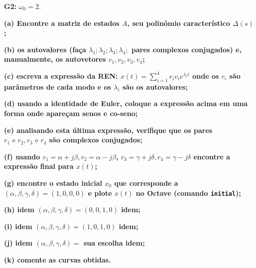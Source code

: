 \documentclass[11pt]{article}
\begin{document}
\textbf{G2: } $\omega_0 = 2$.

\textbf{(a) Encontre a matriz de estados $A$, seu polinômio característico $\Delta(s)$;}

\textbf{(b) os autovalores (faça $\lambda_1; \lambda_2; \lambda_3; \lambda_4;$ pares complexos conjugados) e, manualmente, os autovetores $v_1, v_2, v_3, v_4$;}

\textbf{(c) escreva a expressão da REN: $x(t) = \sum_{i=1}^{4} r_i v_i e^{\lambda_i t}$ onde os $r_i$ são parâmetros de cada modo e os $\lambda_i$ são os autovalores;}

\textbf{(d) usando a identidade de Euler, coloque a expressão acima em uma forma onde apareçam senos e co-seno;}

\textbf{(e) analisando esta última expressão, verifique que os pares $r_1 \text{ e } r_2, r_3 \text{ e } r_4$ são complexos conjugados;}

\textbf{(f) usando $r_1 = \alpha + j\beta, r_2 = \alpha - j\beta$, $r_3 = \gamma + j\delta, r_4 = \gamma - j\delta$ encontre a expressão final para $x(t)$;}

\textbf{(g) encontre o estado inicial $x_0$ que corresponde a $(\alpha, \beta, \gamma, \delta) = (1, 0, 0, 0)$ e plote $x(t)$ no Octave (comando \texttt{initial});}

\textbf{(h) idem $(\alpha, \beta, \gamma, \delta) = (0, 0, 1, 0)$ idem;}

\textbf{(i) idem $(\alpha, \beta, \gamma, \delta) = (1, 0, 1, 0)$ idem;}

\textbf{(j) idem $(\alpha, \beta, \gamma, \delta) = $ sua escolha idem;}

\textbf{(k) comente as curvas obtidas.}
\end{document}
